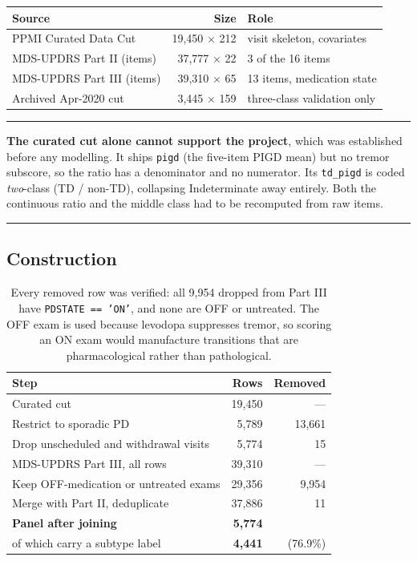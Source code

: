 \documentclass[11pt,a4paper]{article}
\newcommand{\code}[1]{\texttt{\small #1}}
\newenvironment{keypoint}
  {\begin{center}\begin{minipage}{0.94\textwidth}%
   \vspace{4pt}\hrule\vspace{7pt}\small}
  {\vspace{7pt}\hrule\vspace{4pt}\end{minipage}\end{center}}
\begin{document}
\begin{table}[H]
\centering
\small
\begin{tabular}{@{}lrl@{}}
\toprule
\textbf{Source} & \textbf{Size} & \textbf{Role} \\
\midrule
PPMI Curated Data Cut       & 19{,}450 $\times$ 212 & visit skeleton, covariates \\
MDS-UPDRS Part II (items)   & 37{,}777 $\times$ 22  & 3 of the 16 items \\
MDS-UPDRS Part III (items)  & 39{,}310 $\times$ 65  & 13 items, medication state \\
Archived Apr-2020 cut       & \phantom{0}3{,}445 $\times$ 159 & three-class validation only \\
\bottomrule
\end{tabular}
\end{table}

\begin{keypoint}
\textbf{The curated cut alone cannot support the project}, which was established
before any modelling. It ships \code{pigd} (the five-item PIGD mean) but no
tremor subscore, so the ratio has a denominator and no numerator. Its
\code{td\_pigd} is coded \emph{two}-class (TD / non-TD), collapsing Indeterminate
away entirely. Both the continuous ratio and the middle class had to be
recomputed from raw items.
\end{keypoint}

\subsection{Construction}

\begin{table}[H]
\centering
\begin{tabular}{@{}lrr@{}}
\toprule
\textbf{Step} & \textbf{Rows} & \textbf{Removed} \\
\midrule
Curated cut                                  & 19{,}450 & --- \\
Restrict to sporadic PD                      & \phantom{0}5{,}789 & 13{,}661 \\
Drop unscheduled and withdrawal visits       & \phantom{0}5{,}774 & \phantom{00,0}15 \\
\midrule
MDS-UPDRS Part III, all rows                 & 39{,}310 & --- \\
Keep OFF-medication or untreated exams       & 29{,}356 & \phantom{0}9{,}954 \\
Merge with Part II, deduplicate              & 37{,}886 & \phantom{00,0}11 \\
\midrule
\textbf{Panel after joining}                 & \textbf{5{,}774} & \\
\quad of which carry a subtype label         & \textbf{4{,}441} & (76.9\%) \\
\bottomrule
\end{tabular}
\caption{Every removed row was verified: all 9{,}954 dropped from Part III have
\code{PDSTATE == 'ON'}, and none are OFF or untreated. The OFF exam is used
because levodopa suppresses tremor, so scoring an ON exam would manufacture
transitions that are pharmacological rather than pathological.}
\end{table}
\end{document}
